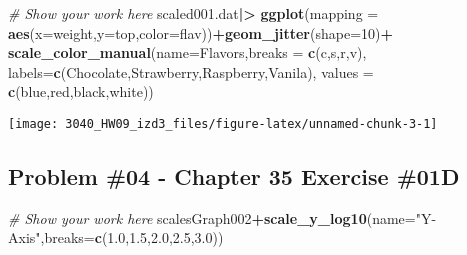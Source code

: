 \documentclass[
]{article}
\newenvironment{Shaded}{\begin{snugshade}}{\end{snugshade}}
\newcommand{\AttributeTok}[1]{\textcolor[rgb]{0.13,0.29,0.53}{#1}}
\newcommand{\CommentTok}[1]{\textcolor[rgb]{0.56,0.35,0.01}{\textit{#1}}}
\newcommand{\DecValTok}[1]{\textcolor[rgb]{0.00,0.00,0.81}{#1}}
\newcommand{\FloatTok}[1]{\textcolor[rgb]{0.00,0.00,0.81}{#1}}
\newcommand{\FunctionTok}[1]{\textcolor[rgb]{0.13,0.29,0.53}{\textbf{#1}}}
\newcommand{\NormalTok}[1]{#1}
\newcommand{\SpecialCharTok}[1]{\textcolor[rgb]{0.81,0.36,0.00}{\textbf{#1}}}
\newcommand{\StringTok}[1]{\textcolor[rgb]{0.31,0.60,0.02}{#1}}
\begin{document}
\begin{Shaded}
\begin{Highlighting}[]
\CommentTok{\# Show your work here}
\NormalTok{scaled001.dat}\SpecialCharTok{|\textgreater{}}
  \FunctionTok{ggplot}\NormalTok{(}\AttributeTok{mapping =} \FunctionTok{aes}\NormalTok{(}\AttributeTok{x=}\NormalTok{weight,}\AttributeTok{y=}\NormalTok{top,}\AttributeTok{color=}\NormalTok{flav))}\SpecialCharTok{+}\FunctionTok{geom\_jitter}\NormalTok{(}\AttributeTok{shape=}\DecValTok{10}\NormalTok{)}\SpecialCharTok{+}
  \FunctionTok{scale\_color\_manual}\NormalTok{(}\AttributeTok{name=}\StringTok{\textquotesingle{}Flavors\textquotesingle{}}\NormalTok{,}\AttributeTok{breaks =} \FunctionTok{c}\NormalTok{(}\StringTok{\textquotesingle{}c\textquotesingle{}}\NormalTok{,}\StringTok{\textquotesingle{}s\textquotesingle{}}\NormalTok{,}\StringTok{\textquotesingle{}r\textquotesingle{}}\NormalTok{,}\StringTok{\textquotesingle{}v\textquotesingle{}}\NormalTok{),}
                     \AttributeTok{labels=}\FunctionTok{c}\NormalTok{(}\StringTok{\textquotesingle{}Chocolate\textquotesingle{}}\NormalTok{,}\StringTok{\textquotesingle{}Strawberry\textquotesingle{}}\NormalTok{,}\StringTok{\textquotesingle{}Raspberry\textquotesingle{}}\NormalTok{,}\StringTok{\textquotesingle{}Vanila\textquotesingle{}}\NormalTok{),}
                     \AttributeTok{values =} \FunctionTok{c}\NormalTok{(}\StringTok{\textquotesingle{}blue\textquotesingle{}}\NormalTok{,}\StringTok{\textquotesingle{}red\textquotesingle{}}\NormalTok{,}\StringTok{\textquotesingle{}black\textquotesingle{}}\NormalTok{,}\StringTok{\textquotesingle{}white\textquotesingle{}}\NormalTok{))}
\end{Highlighting}
\end{Shaded}

\texttt{[image: 3040\_HW09\_izd3\_files/figure-latex/unnamed-chunk-3-1]}

\newpage

\hypertarget{problem-04---chapter-35-exercise-01d}{%
\subsection{Problem \#04 - Chapter 35 Exercise
\#01D}\label{problem-04---chapter-35-exercise-01d}}

\begin{Shaded}
\begin{Highlighting}[]
\CommentTok{\# Show your work here}
\NormalTok{scalesGraph002}\SpecialCharTok{+}\FunctionTok{scale\_y\_log10}\NormalTok{(}\AttributeTok{name=}\StringTok{"Y{-}Axis"}\NormalTok{,}\AttributeTok{breaks=}\FunctionTok{c}\NormalTok{(}\FloatTok{1.0}\NormalTok{,}\FloatTok{1.5}\NormalTok{,}\FloatTok{2.0}\NormalTok{,}\FloatTok{2.5}\NormalTok{,}\FloatTok{3.0}\NormalTok{))}
\end{Highlighting}
\end{Shaded}
\end{document}

